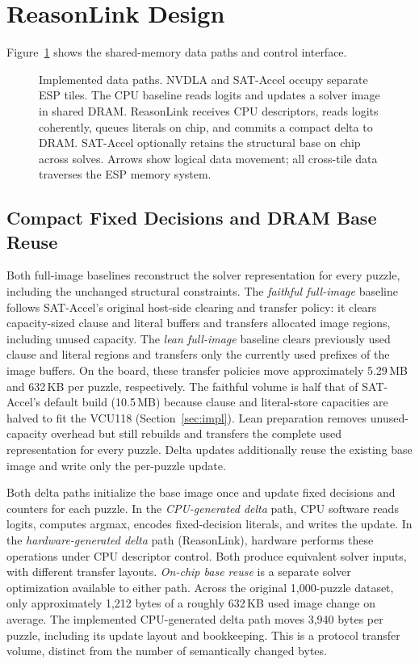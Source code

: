 \section{ReasonLink Design}
Figure~\ref{fig:pipeline} shows the shared-memory data paths and control interface.
\begin{figure}[t]
\centering

\caption{Implemented data paths. NVDLA and SAT-Accel occupy separate ESP tiles. The CPU baseline reads logits and updates a solver image in shared DRAM. ReasonLink receives CPU descriptors, reads logits coherently, queues literals on chip, and commits a compact delta to DRAM. SAT-Accel optionally retains the structural base on chip across solves. Arrows show logical data movement; all cross-tile data traverses the ESP memory system.}
\label{fig:pipeline}
\end{figure}

\subsection{Compact Fixed Decisions and DRAM Base Reuse}
Both full-image baselines reconstruct the solver representation for every puzzle, including the unchanged structural constraints. The \emph{faithful full-image} baseline follows SAT-Accel's original host-side clearing and transfer policy: it clears capacity-sized clause and literal buffers and transfers allocated image regions, including unused capacity. The \emph{lean full-image} baseline clears previously used clause and literal regions and transfers only the currently used prefixes of the image buffers. On the board, these transfer policies move approximately 5.29\,MB and 632\,KB per puzzle, respectively. The faithful volume is half that of SAT-Accel's default build (10.5\,MB) because clause and literal-store capacities are halved to fit the VCU118 (Section~\ref{sec:impl}). Lean preparation removes unused-capacity overhead but still rebuilds and transfers the complete used representation for every puzzle. Delta updates additionally reuse the existing base image and write only the per-puzzle update.

Both delta paths initialize the base image once and update fixed decisions and counters for each puzzle. In the \emph{CPU-generated delta} path, CPU software reads logits, computes argmax, encodes fixed-decision literals, and writes the update. In the \emph{hardware-generated delta} path (ReasonLink), hardware performs these operations under CPU descriptor control. Both produce equivalent solver inputs, with different transfer layouts. \emph{On-chip base reuse} is a separate solver optimization available to either path. Across the original 1,000-puzzle dataset, only approximately 1,212 bytes of a roughly 632\,KB used image change on average. The implemented CPU-generated delta path moves 3,940 bytes per puzzle, including its update layout and bookkeeping. This is a protocol transfer volume, distinct from the number of semantically changed bytes.

